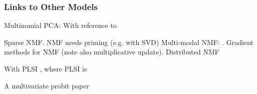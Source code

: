 

\subsubsection{Links to Other Models}

Multinomial PCA: \cite{Buntine2002} With reference to \cite{Rubin2011}

Sparse NMF\cite{Hoyer2004}. NMF needs priming (e.g. with SVD) \cite{Boutsidis2008}
Multi-modal NMF: \cite{Bouchard2012}. Gradient methods for NMF (note also multiplicative update)\cite{Lin2007}. Distributed NMF\cite{Liu2010}

With PLSI \cite{GiKa2003}, where PLSI is\cite{Hofmann1999}

A multivariate probit paper \cite{Talhouk2011}


